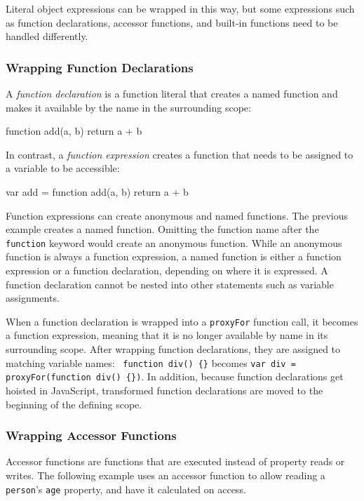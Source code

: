 \documentclass{sigplanconf}
\begin{document}
Literal object expressions can be wrapped in this way, but some expressions such as function declarations, accessor functions, and built-in functions need to be handled differently.

\subsubsection{Wrapping Function Declarations}

A \emph{function declaration} is a function literal that creates a named function and makes it available by the name in the surrounding scope:
\begin{code}
function add(a, b) { return a + b }
\end{code}

In contrast, a \emph{function expression} creates a function that needs to be assigned to a variable to be accessible:
\begin{code}
var add = function add(a, b) { return a + b }
\end{code}

Function expressions can create anonymous and named functions.
The previous example creates a named function.
Omitting the function name after the \lstinline{function} keyword would create an anonymous function.
While an anonymous function is always a function expression, a named function is either a function expression or a function declaration, depending on where it is expressed.
A function declaration cannot be nested into other statements such as variable assignments.

\begin{sloppypar} 
When a function declaration is wrapped into a \lstinline{proxyFor} function call, it becomes a function expression, meaning that it is no longer available by name in its surrounding scope.
After wrapping function declarations, they are assigned to matching variable names:~
\lstinline|function div() {}| becomes \lstinline|var div = proxyFor(function div() {})|.
In addition, because function declarations get hoisted in JavaScript, transformed function declarations are moved to the beginning of the defining scope.
\end{sloppypar}

\subsubsection{Wrapping Accessor Functions}

Accessor functions are functions that are executed instead of property reads or writes.
The following example uses an accessor function to allow reading a \lstinline{person}'s \lstinline{age} property, and have it calculated on access.
\end{document}
